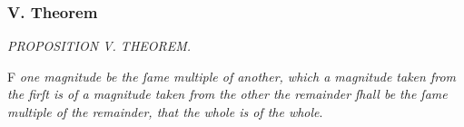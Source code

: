\documentclass[11pt,preview]{standalone}
\begin{document}
\subsubsection{V. Theorem}

\begin{minipage}{\textwidth}
    \begin{center}
        \textit{PROPOSITION V. THEOREM.}\label{book5pr5} \\
    \end{center}

    \hfill

    \begin{center}
        \raggedright \lettrine[lines=3, loversize=1, nindent=0pt]{}{}F \textit{one magnitude be the ſame multiple of another, which a magnitude taken from the firſt is of a magnitude taken from the other the remainder ſhall be the ſame multiple of the remainder, that the whole is of the whole}.
    \end{center}
\end{minipage}

\hfill

\hfill
\end{document}
